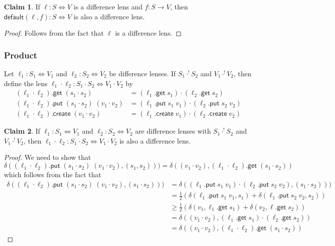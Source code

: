 \documentclass[acmsmall,review,anonymous]{acmart}\settopmatter{printfolios=true,printccs=false,printacmref=false}
\theoremstyle{definition}
\newtheorem{claim}{Claim}
\newcommand{\kw}[1]{\ensuremath{\mathsf{#1}}\xspace}
\newcommand{\get}{\ensuremath{\kw{get}}\xspace}
\newcommand{\pput}{\ensuremath{\kw{put}}\xspace}
\newcommand{\create}{\ensuremath{\kw{create}}\xspace}
\newcommand{\default}{\ensuremath{\kw{default}}\xspace}
\begin{document}
\begin{claim}
If $\ell : S \Leftrightarrow V$ is a difference lens and $f: S \longrightarrow V$, then $\default(\ell, f) : S \Leftrightarrow V$ is also a difference lens.
\end{claim}
\begin{proof}
Follows from the fact that $\ell$ is a difference lens.
\end{proof}
\subsubsection{Product}
Let $\ell_1 : S_1 \Leftrightarrow V_1$ and $\ell_2 : S_2 \Leftrightarrow V_2$ be difference
lenses. If $S_1 \cdot^{!} S_2$ and $V_1 \cdot^{!} V_2$, then define the lens $\ell_1 \cdot \ell_2 : S_1 \cdot S_2 \Leftrightarrow
V_1 \cdot V_2$ by
\begin{align*}
(\ell_1 \cdot \ell_2).\get \; (s_1 \cdot s_2) &= (\ell_1.\get \; s_1) \cdot (\ell_2.\get \; s_2)\\
(\ell_1 \cdot \ell_2).\pput \; (s_1 \cdot s_2) \; (v_1 \cdot v_2) &= (\ell_1.\pput \; s_1
\; v_1) \cdot (\ell_2.\pput \; s_2 \; v_2)\\
(\ell_1 \cdot \ell_2).\create \; (v_1 \cdot v_2) &= (\ell_1.\create \; v_1) \cdot (\ell_2.\create \; v_2)
\end{align*}
\begin{claim}\label{productislens}
If $\ell_1 :S_1 \Leftrightarrow V_1$ and $\ell_2 : S_2 \Leftrightarrow V_2$ are difference lenses with $S_1 \cdot^{!} S_2$ and $V_1 \cdot^{!} V_2$, then
$\ell_1 \cdot \ell_2  : S_1 \cdot S_2 \Leftrightarrow V_1 \cdot V_2$ is also a difference lens.
\end{claim}
\begin{proof}
We need to show that
$$\delta((\ell_1 \cdot
\ell_2).\pput \; (s_1 \cdot s_2) \; (v_1 \cdot v_2), (s_1, s_2))) = \delta((v_1 \cdot v_2),
(\ell_1 \cdot \ell_2).\get \; (s_1 \cdot s_2))$$ which follows from the fact that
\begin{align*}
\delta((\ell_1 \cdot
\ell_2).\pput \; (s_1 \cdot s_2) \; (v_1 \cdot v_2), (s_1 \cdot s_2))) &= \delta((\ell_1.\pput \; s_1 \; v_1) \cdot
(\ell_2.\pput \; s_2 \; v_2), (s_1 \cdot s_2)))  \\
&= \frac{1}{2}(\delta(\ell_1.\pput \; s_1 \; v_1, s_1) + \delta(\ell_1.\pput \; s_2 \; v_2, s_2))\\
&\geq \frac{1}{2}(\delta(v_1, \ell_1.\get \; s_1) + \delta(v_2, \ell.\get \; s_2))\\
&= \delta((v_1 \cdot v_2), (\ell_1.\get \; s_1) \cdot (\ell_2.\get \; s_2))\\
&= \delta((v_1 \cdot v_2),
(\ell_1 \cdot \ell_2).\get \; (s_1 \cdot s_2))
\end{align*}
\end{proof}
\end{document}
